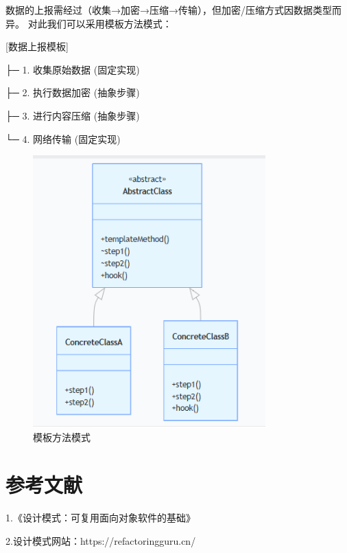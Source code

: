 \documentclass[12pt]{ctexart} %
\begin{document}
数据的上报需经过（收集→加密→压缩→传输），但加密/压缩方式因数据类型而异。
对此我们可以采用模板方法模式：

[数据上报模板]

├─ 1. 收集原始数据 (固定实现)

├─ 2. 执行数据加密 (抽象步骤)

├─ 3. 进行内容压缩 (抽象步骤)

└─ 4. 网络传输 (固定实现)

\begin{figure}[H]
  \centering
  \includegraphics[width=0.8\textwidth]{moshi.png}
  \caption{模板方法模式}
\end{figure}

\section{参考文献} %
1.《设计模式：可复用面向对象软件的基础》

2.设计模式网站：https://refactoringguru.cn/
\end{document}
